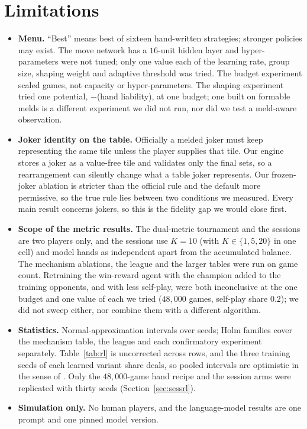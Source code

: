 \documentclass[10pt,journal,compsoc]{IEEEtran}
\begin{document}
\section{Limitations}\label{sec:lim}
\begin{itemize}\itemsep0pt
\item \textbf{Menu.} ``Best'' means best of sixteen hand-written strategies; stronger policies may exist. The move network has a $16$-unit hidden layer and hyper-parameters were not tuned; only one value each of the learning rate, group size, shaping weight and adaptive threshold was tried. The budget experiment scaled games, not capacity or hyper-parameters. The shaping experiment tried one potential, $-$(hand liability), at one budget; one built on formable melds is a different experiment we did not run, nor did we test a meld-aware observation.
\item \textbf{Joker identity on the table.} Officially a melded joker must keep representing the same tile unless the player supplies that tile. Our engine stores a joker as a value-free tile and validates only the final sets, so a rearrangement can silently change what a table joker represents. Our frozen-joker ablation is stricter than the official rule and the default more permissive, so the true rule lies between two conditions we measured. Every main result concerns jokers, so this is the fidelity gap we would close first.
\item \textbf{Scope of the metric results.} The dual-metric tournament and the sessions are two players only, and the sessions use $K=10$ (with $K\in\{1,5,20\}$ in one cell) and model hands as independent apart from the accumulated balance. The mechanism ablations, the league and the larger tables were run on game count. Retraining the win-reward agent with the champion added to the training opponents, and with less self-play, were both inconclusive at the one budget and one value of each we tried ($48{,}000$ games, self-play share $0.2$); we did not sweep either, nor combine them with a different algorithm.
\item \textbf{Statistics.} Normal-approximation intervals over seeds; Holm families cover the mechanism table, the league and each confirmatory experiment separately. Table~\ref{tab:rl} is uncorrected across rows, and the three training seeds of each learned variant share deals, so pooled intervals are optimistic in the sense of \cite{agarwal2021}. Only the $48{,}000$-game hand recipe and the session arms were replicated with thirty seeds (Section~\ref{sec:sessrl}).
\item \textbf{Simulation only.} No human players, and the language-model results are one prompt and one pinned model version.
\end{itemize}
\end{document}
